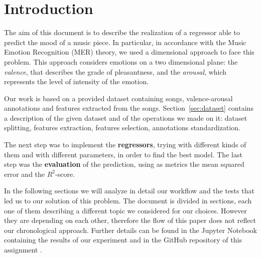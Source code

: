 \section{Introduction}

The aim of this document is to describe the realization of a regressor able to predict the mood of a music piece. In particular, in accordance with the Music Emotion Recognition (MER) theory, we used a dimensional approach to face this problem. This approach considers emotions on a two dimensional plane: the \emph{valence}, that describes the grade of pleasantness, and the \emph{arousal}, which represents the level of intensity of the emotion.

Our work is based on a provided dataset containing songs, valence-arousal annotations and features extracted from the songs. Section~\ref{sec:dataset} contains a description of the given dataset and of the operations we made on it: dataset splitting, features extraction, features selection, annotations standardization.

The next step was to implement the \textbf{regressors}, trying with different kinds of them and with different parameters, in order to find the best model. The last step was the \textbf{evaluation} of the prediction, using as metrics the mean squared error and the $R^2$-score.

In the following sections we will analyze in detail our workflow and the tests that led us to our solution of this problem. The document is divided in sections, each one of them describing a different topic we considered for our choices. However they are depending on each other, therefore the flow of this paper does not reflect our chronological approach. Further details can be found in the Jupyter Notebook containing the results of our experiment \cite{notebook} and in the GitHub repository of this assignment \cite{github}.

